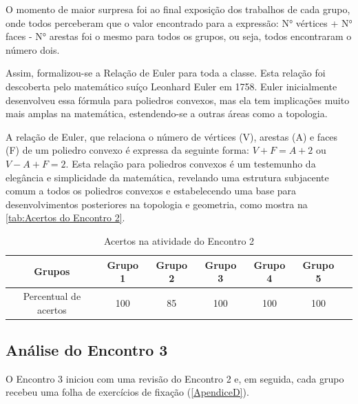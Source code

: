 O momento de maior surpresa foi ao final exposição dos trabalhos de cada grupo, onde todos perceberam que o valor encontrado para a expressão: N° vértices + N° faces - N° arestas foi o mesmo para todos os grupos, ou seja, todos encontraram o número dois.

Assim, formalizou-se a Relação de Euler para toda a classe. Esta relação foi descoberta pelo matemático suíço Leonhard Euler em 1758. Euler inicialmente desenvolveu essa fórmula para poliedros convexos, mas ela tem implicações muito mais amplas na matemática, estendendo-se a outras áreas como a topologia.

A relação de Euler, que relaciona o número de vértices (V), arestas (A) e faces (F) de um poliedro convexo é expressa da seguinte forma: \textcolor[HTML]{0000FF}{$V + F = A + 2$} ou \textcolor[HTML]{0000FF}{$V - A + F = 2$}. Esta relação para poliedros convexos é um testemunho da elegância e simplicidade da matemática, revelando uma estrutura subjacente comum a todos os poliedros convexos e estabelecendo uma base para desenvolvimentos posteriores na topologia e geometria, como mostra na \autoref{tab:Acertos do Encontro 2}.

\begin{table}[htbp] \centering
    \caption{Acertos na atividade do Encontro 2} \label{tab:Acertos do Encontro 2} \begin{tabular}{|c|c|c|c|c|c|c|}
        \hline
        \textbf{Grupos}       & \textbf{Grupo 1} & \textbf{Grupo 2} & \textbf{Grupo 3} & \textbf{Grupo 4} & \textbf{Grupo 5} \\
        \hline
        Percentual de acertos & 100              & 85               & 100              & 100              & 100              \\
        \hline
    \end{tabular}
    \legend{\legendaTabela}
\end{table}

\subsection{Análise do Encontro 3}

O Encontro 3 iniciou com uma revisão do Encontro 2 e, em seguida, cada grupo recebeu uma folha de exercícios de fixação (\autoref{ApendiceD}).


